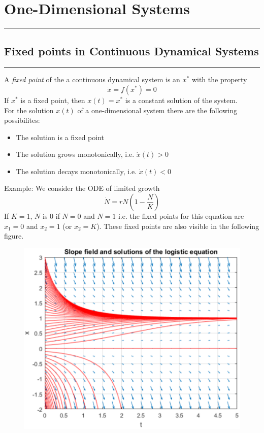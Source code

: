 \section{One-Dimensional Systems}
\noindent\rule[\linienAbstand]{\linewidth}{\linienDickeDick}

\subsection{Fixed points in Continuous Dynamical Systems}
\noindent\rule[\linienAbstand]{\linewidth}{\linienDicke}
A \emph{fixed point} of the a continuous dynamical system is an $x^*$ with the property
\begin{equation}
  \dot{x} = f(x^*) = 0
\end{equation}
If $x^*$ is a fixed point, then $x(t) = x^*$ is a constant solution of the system.\\

For the solution $x(t)$ of a one-dimensional system there are the following possibilites:
\begin{itemize}
  \item The solution is a fixed point
  \item The solution grows monotonically, i.e. $\dot{x}(t) > 0$
  \item The solution decays monotonically, i.e. $\dot{x}(t) < 0$
\end{itemize}

Example: We consider the ODE of limited growth
\begin{equation}
  \dot{N} = rN\left(1-\frac{N}{K}\right)
\end{equation}
If $K = 1$, $\dot{N}$ is $0$ if $N = 0$ and $N = 1$ i.e. the fixed points for this equation are $x_1 = 0$ and $x_2 = 1$ (or $x_2 = K$). These fixed points are also visible in the following figure.

\begin{figure}[H]
  \centering
  \includegraphics[width=.7\linewidth]{Pics/4.2.png}
\end{figure}

